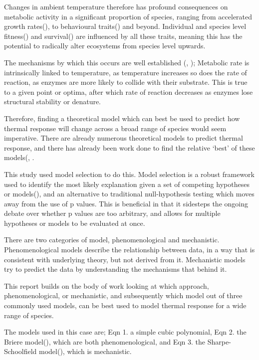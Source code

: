 \documentclass[11pt]{article}
\begin{document}
Changes in ambient temperature therefore has profound consequences on metabolic activity in a significant proportion of species, ranging from accelerated growth rates(\cite{Brown2004}), to behavioural traits(\cite{Saastamoinen2008}) and beyond. Individual and species level fitness(\cite{Gilchrist1995}) and survival(\cite{Huey2009}) are influenced by all these traits, meaning this has the potential to radically alter ecosystems from species level upwards.

The mechanisms by which this occurs are well established (\cite{Brown2004}, \cite{Savage2004});
Metabolic rate is intrinsically linked to temperature, as temperature increases so does the rate of reaction, as enzymes are more likely to collide with their substrate. This is true to a given point or optima, after which rate of reaction decreases as enzymes lose structural stability or denature. 

Therefore, finding a theoretical model which can best be used to predict how thermal response will change across a broad range of species would seem imperative. There are already numerous theoretical models to predict thermal response, and there has already been work done to find the relative ‘best’ of these models(\cite{Angilletta2006}, \cite{Shi2010}. 

This study used model selection to do this. Model selection is a robust framework used to identify the most likely explanation given a set of competing hypotheses or models(\cite{Johnson2004}), and an alternative to traditional null-hypothesis testing which moves away from the use of p values. This is beneficial in that it sidesteps the ongoing debate over whether p values are too arbitrary, and allows for multiple hypotheses or models to be evaluated at once.  

There are two categories of model, phenomenological and mechanistic. Phenomenological models describe the relationship between data, in a way that is consistent with underlying theory, but not derived from it. Mechanistic models try to predict the data by understanding the mechanisms that behind it. 

This report builds on the body of work looking at which approach, phenomenological, or mechanistic, and subsequently which model out of three commonly used models, can be best used to model thermal response for a wide range of species.  

The models used in this case are; Eqn 1. a simple cubic polynomial, Eqn 2. the Briere model(\cite{Briere1999}), which are both phenomenological, and Eqn 3. the Sharpe-Schoolfield model(\cite{Schoolfield1981}), which is mechanistic. 
\end{document}
